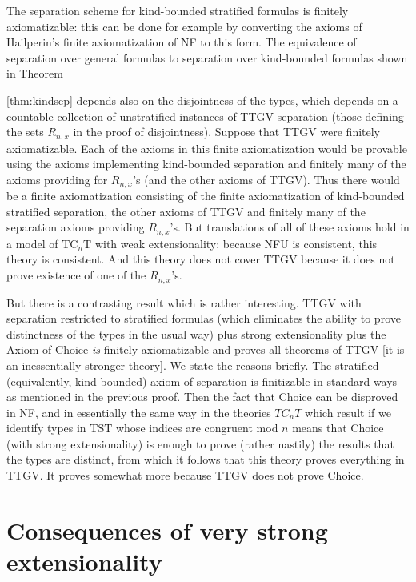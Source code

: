 \documentclass[12pt]{article}
\begin{document}
\Proof  The separation scheme for kind-bounded stratified formulas is finitely axiomatizable:  this can be done for example by converting the axioms of Hailperin's finite axiomatization of NF to this form.  The equivalence of separation over general formulas to separation over kind-bounded  formulas shown in Theorem {\ref{thm:kindsep} depends also on the disjointness of the types, which depends on a countable collection
  of unstratified instances of TTGV separation (those defining the sets $R_{n,x}$ in the proof of disjointness).  Suppose that TTGV were finitely axiomatizable.  Each of the axioms in this finite axiomatization would be provable using the axioms implementing kind-bounded separation and finitely many of the axioms providing for $R_{n,x}$'s (and the other axioms of TTGV).  Thus there would be a finite axiomatization consisting of the finite axiomatization of kind-bounded stratified separation, the other axioms of TTGV and finitely many of the separation axioms providing $R_{n,x}$'s.  But translations of all of these axioms hold in a model of TC$_n$T with weak extensionality:  because NFU is consistent, this theory is consistent.  And this theory does not cover TTGV because it does not prove existence of one of the $R_{n,x}$'s.

  \endproof

But there is a contrasting result which is rather interesting.   TTGV with separation restricted to stratified formulas (which eliminates the ability to prove distinctness of the types in the usual way) plus strong extensionality plus the Axiom of Choice {\em is\/} finitely axiomatizable and proves all theorems of TTGV [it is an inessentially stronger theory].  We state the reasons briefly.  The stratified (equivalently, kind-bounded) axiom of separation is finitizable in standard ways as mentioned in the previous proof. Then the fact that Choice can be disproved in NF, and in essentially the same way in the theories $TC_nT$ which result if we identify types in TST whose indices are congruent mod $n$ means that Choice (with strong extensionality) is enough to prove (rather nastily) the results that the types are distinct, from which it follows that this theory proves everything in TTGV.  It proves somewhat more because TTGV does not prove Choice.




\section{Consequences of very strong extensionality}

}
\end{document}
